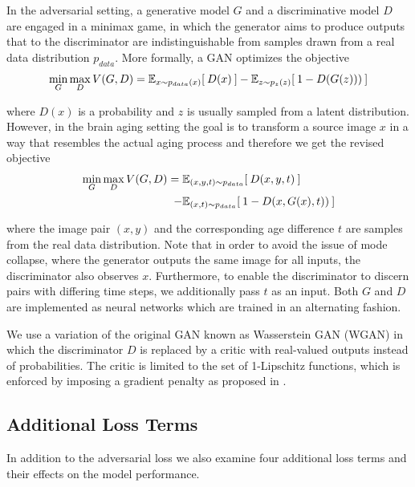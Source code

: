 In the adversarial setting, a generative model $G$ and a discriminative model $D$ are engaged in a minimax game, in which the generator aims to produce outputs that to the discriminator are indistinguishable from samples drawn from a real data distribution $p_{data}$. More formally, a GAN optimizes the objective
\begin{equation}
	\min_G \max_D V(G, D) = \mathbb{E}_{ x \sim p_{data}(x) } [ \: D (x) \: ] 
	 - \mathbb{E}_{ z \sim p_z(z) } [ \: 1 - D (G(z))) \: ]
\end{equation}

where $D(x)$ is a probability and $z$ is usually sampled from a latent distribution. However, in the brain aging setting the goal is to transform a source image $x$ in a way that resembles the actual aging process and therefore we get the revised objective
\begin{equation}
	\begin{split}
		\min_G \max_D V(G, D) = \; & \mathbb{E}_{ (x, y, t) \sim p_{data} } [ \: D (x, y, t) \: ] \\
		 - & \mathbb{E}_{ (x, t) \sim p_{data} } [ \: 1 - D (x, G(x), t)) \: ]
	\end{split}
\end{equation}

where the image pair $(x, y)$ and the corresponding age difference $t$ are samples from the real data distribution. Note that in order to avoid the issue of mode collapse, where the generator outputs the same image for all inputs, the discriminator also observes $x$. Furthermore, to enable the discriminator to discern pairs with differing time steps, we additionally pass $t$ as an input. Both $G$ and $D$ are implemented as neural networks which are trained in an alternating fashion. 

We use a variation of the original GAN known as Wasserstein GAN (WGAN) \cite{arjovsky2017wasserstein} in which the discriminator $D$ is replaced by a critic with real-valued outputs instead of probabilities. The critic is limited to the set of 1-Lipschitz functions, which is enforced by imposing a gradient penalty as proposed in \cite{gulrajani2017improved}.

\subsection{Additional Loss Terms}
In addition to the adversarial loss we also examine four additional loss terms and their effects on the model performance.


